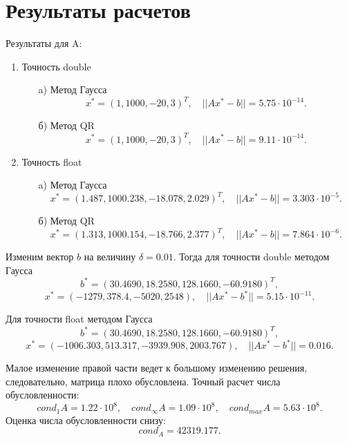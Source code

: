\documentclass[12pt, a4paper]{article}
\begin{document}
\section{Результаты расчетов}
Результаты для A:
\begin{enumerate}
\item Точность double
	\begin{enumerate}
	\item[a)] Метод Гаусса
	$$x^* = (1 , 1000, -20 ,3)^{T},\quad ||Ax^{*}-b|| = 5{.}75\cdot10^{-14}.$$
	\item[б)] Метод QR
	$$x^* = (1 , 1000, -20 ,3)^{T},\quad ||Ax^{*}-b|| = 9{.}11\cdot10^{-14}.$$
	\end{enumerate}
\item Точность float
	\begin{enumerate}
	\item[a)] Метод Гаусса
	$$x^* = (1{.}487 , 1000{.}238, -18{.}078 ,2{.}029)^{T},\quad ||Ax^{*}-b|| = 3{.}303\cdot10^{-5}.$$
	\item[б)] Метод QR
$$x^* = (1{.}313 , 1000{.}154, -18{.}766 ,2{.}377)^{T},\quad ||Ax^{*}-b|| = 7{.}864\cdot10^{-6}.$$
	\end{enumerate}
\end{enumerate}
Изменим вектор $b$ на величину $\delta = 0.01$. Тогда для точности double методом Гаусса
$$b^* = (30.4690, 18{.}2580, 128{.}1660, -60{.}9180)^T,$$
$$x^* = (-1279, 378{.}4, -5020, 2548), \quad ||Ax^{*}-b^*|| =  5{.}15\cdot10^{-11}.$$

Для точности float методом Гаусса
$$b^* = (30.4690, 18{.}2580, 128{.}1660, -60{.}9180)^T,$$
$$x^* = (-1006{.}303, 513{.}317, -3939{.}908, 2003{.}767), \quad ||Ax^{*}-b^*|| =  0{.}016.$$

Малое изменение правой части ведет к большому изменению решения, следовательно, матрица плохо обусловлена. Точный расчет числа обусловленности: 
$$cond_1A = 1{.}22\cdot10^8,\quad cond_{\infty}A = 1{.}09\cdot10^8, \quad cond_{max}A = 5{.}63\cdot10^8 .$$ 
Оценка числа обусловленности снизу:
$$cond_A = 42319{.}177.$$
\end{document}
